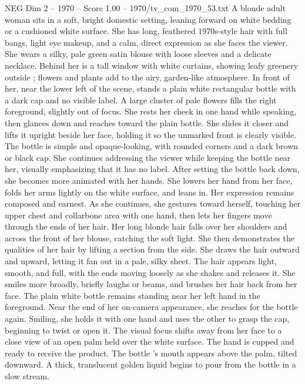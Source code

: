 \begin{textsample}{NEG Dim 2 – 1970 – Score 1.00 – 1970/tv\_com\_1970\_53.txt}  \label{ex:f2_neg_026}
A blonde adult woman sits in a soft, bright domestic setting, leaning forward on white bedding or a cushioned white surface.
She has long, feathered 1970s-style hair with full bangs, light eye makeup, and a calm, direct expression as she faces the viewer.
She wears a silky, pale green satin blouse with loose sleeves and a delicate necklace.
Behind her is a tall window with white curtains, showing leafy greenery outside ; flowers and plants add to the airy, garden-like atmosphere.
In front of her, near the lower left of the scene, stands a plain white rectangular bottle with a dark cap and no visible label.
A large cluster of pale flowers fills the right foreground, slightly out of focus.
She rests her cheek in one hand while speaking, then glances down and reaches toward the plain bottle.
She slides it closer and lifts it upright beside her face, holding it so the unmarked front is clearly visible.
The bottle is simple and opaque-looking, with rounded corners and a dark brown or black cap.
She continues addressing the viewer while keeping the bottle near her, visually emphasizing that it has no label.
After setting the bottle back down, she becomes more animated with her hands.
She lowers her hand from her face, folds her arms lightly on the white surface, and leans in.
Her expression remains composed and earnest.
As she continues, she gestures toward herself, touching her upper chest and collarbone area with one hand, then lets her fingers move through the ends of her hair.
Her long blonde hair falls over her shoulders and across the front of her blouse, catching the soft light.
She then demonstrates the qualities of her hair by lifting a section from the side.
She draws the hair outward and upward, letting it fan out in a pale, silky sheet.
The hair appears light, smooth, and full, with the ends moving loosely as she shakes and releases it.
She smiles more broadly, briefly laughs or beams, and brushes her hair back from her face.
The plain white bottle remains standing near her left hand in the foreground.
Near the end of her on-camera appearance, she reaches for the bottle again.
Smiling, she holds it with one hand and uses the other to grasp the cap, beginning to twist or open it.
The visual focus shifts away from her face to a close view of an open palm held over the white surface.
The hand is cupped and ready to receive the product.
The bottle ’s mouth appears above the palm, tilted downward.
A thick, translucent golden liquid begins to pour from the bottle in a slow stream.

\end{textsample}
